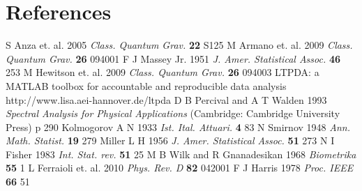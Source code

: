 \documentclass[fleqn,10pt,twoside,a4paper,DIV11]{scrbook}
\begin{document}
\section*{References}
\begin{thebibliography}{10}
 S Anza et. al. 2005 {\it Class. Quantum Grav.} {\bf 22} S125
 M Armano et. al. 2009 {\it Class. Quantum Grav.} {\bf 26} 094001
 F J Massey Jr. 1951 {\it J. Amer. Statistical Assoc.} {\bf 46} 253
 M Hewitson et. al. 2009 {\it Class. Quantum Grav.} {\bf 26} 094003
 LTPDA: a MATLAB toolbox for accountable and reproducible data analysis http://www.lisa.aei-hannover.de/ltpda
 D B Percival and A T Walden 1993 {\it Spectral Analysis for Physical Applications} (Cambridge: Cambridge University Press) p 290
 Kolmogorov A N 1933 {\it Ist. Ital. Attuari.} {\bf 4} 83
 N Smirnov 1948 {\it Ann. Math. Statist.} {\bf 19} 279
 Miller L H 1956 {\it J. Amer. Statistical Assoc.} {\bf 51} 273
 N I Fisher 1983 {\it Int. Stat. rev.} {\bf 51} 25
 M B Wilk and R Gnanadesikan 1968 {\it Biometrika} {\bf 55} 1
 L Ferraioli et. al. 2010 {\it Phys. Rev. D} {\bf 82} 042001
 F J Harris 1978 {\it Proc. IEEE} {\bf 66} 51
\end{thebibliography}
\end{document}
